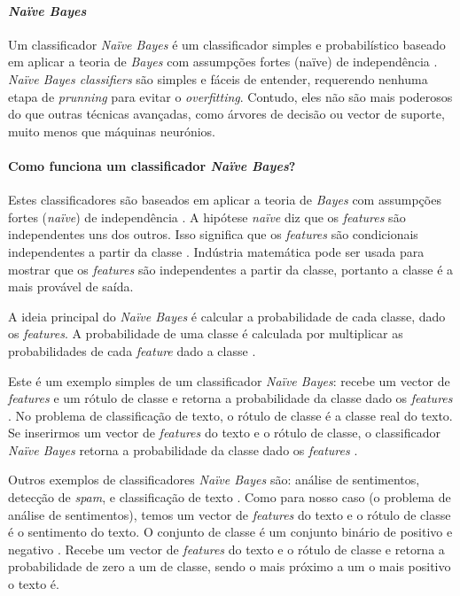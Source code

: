 \paragraph{\textit{Naïve Bayes}\\}

Um classificador \textit{Naïve Bayes} é um classificador simples e probabilístico baseado em aplicar a teoria de \textit{Bayes} com assumpções fortes ({naïve}) de independência \cite{mbn1}. \textit{Naïve Bayes classifiers} são simples e fáceis de entender, requerendo nenhuma etapa de \textit{prunning} para evitar o \textit{overfitting}. Contudo, eles não são mais poderosos do que outras técnicas avançadas, como árvores de decisão ou vector de suporte, muito menos que máquinas neurónios.

\paragraph{Como funciona um classificador \textit{Naïve Bayes}?\\}

Estes classificadores são baseados em aplicar a teoria de \textit{Bayes} com assumpções fortes (\textit{naïve}) de independência \cite{mbn1}. A hipótese \textit{naïve} diz que os \textit{features} são independentes uns dos outros. Isso significa que os \textit{features} são condicionais independentes a partir da classe \cite{gfg2}. Indústria matemática pode ser usada para mostrar que os \textit{features} são independentes a partir da classe, portanto a classe é a mais provável de saída.

A ideia principal do \textit{Naïve Bayes} é calcular a probabilidade de cada classe, dado os \textit{features}. A probabilidade de uma classe é calculada por multiplicar as probabilidades de cada \textit{feature} dado a classe \cite{mbn1}.

Este é um exemplo simples de um classificador \textit{Naïve Bayes}: recebe um vector de \textit{features} e um rótulo de classe e retorna a probabilidade da classe dado os \textit{features} \cite{skl1}. No problema de classificação de texto, o rótulo de classe é a classe real do texto. Se inserirmos um vector de \textit{features} do texto e o rótulo de classe, o classificador \textit{Naïve Bayes} retorna a probabilidade da classe dado os \textit{features} \cite{gfg2}.

Outros exemplos de classificadores \textit{Naïve Bayes} são: análise de sentimentos, detecção de \textit{spam}, e classificação de texto \cite{mbn1}. Como para nosso caso (o problema de análise de sentimentos), temos um vector de \textit{features} do texto e o rótulo de classe é o sentimento do texto. O conjunto de classe é um conjunto binário de positivo e negativo \cite{gfg2}. Recebe um vector de \textit{features} \cite{skl1} do texto e o rótulo de classe e retorna a probabilidade de zero a um de classe, sendo o mais próximo a um o mais positivo o texto é.

